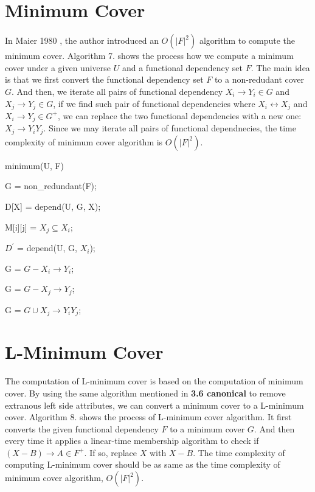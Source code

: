 \documentclass[11pt]{book}
\begin{document}
\section{Minimum Cover}

In Maier 1980 \cite{maier1980minimum}, the author introduced an $O(|F|^2)$ algorithm to compute the minimum cover. Algorithm 7. shows the process how we compute a minimum cover under a given universe $U$ and a functional dependency set $F$. The main idea is that we first convert the functional dependency set $F$ to a non-redudant cover $G$. And then, we iterate all pairs of functional dependency $X_i \rightarrow Y_i \in G$ and $X_j \rightarrow Y_j \in G$, if we find such pair of functional dependencies where $X_i \leftrightarrow X_j$ and $X_i \rightarrow Y_j \in G^{+}$, we can replace the two functional dependencies with a new one: $X_j \rightarrow Y_iY_j$. Since we may iterate all pairs of functional dependnecies, the time complexity of minimum cover algorithm is $O(|F|^2)$.

\begin{algorithm}
  \caption{minimum(U, F)}
  
  \SetAlgoLined
  
  G = non\_redundant(F);
  
   {
  	D[X] = depend(U, G, X);
  }
  
   {
  	 {
  	  M[i][j] = $X_j \subseteq X_i$;  	
  	}
  }
  
   {
    $D^{'}$ = depend(U, G, $X_i$);
    
     {
       {
      	G = $G - {X_i \rightarrow Y_i}$;
      	
      	G = $G - {X_j \rightarrow Y_j}$;

      	G = $G \cup {X_j \rightarrow Y_iY_j}$;
      }
    }    
  }
\end{algorithm}

\section{L-Minimum Cover}

The computation of L-minimum cover is based on the computation of minimum cover. By using the same algorithm \cite{beeri1979computational} mentioned in \textbf{3.6 canonical} to remove extranous left side attributes, we can convert a minimum cover to a L-minimum cover. Algorithm 8. shows the process of L-minimum cover algorithm. It first converts the given functional dependency $F$ to a minimum cover $G$. And then every time it applies a linear-time membership algorithm to check if $(X - B) \rightarrow A \in F^{+}$. If so, replace $X$ with $X - B$. The time complexity of computing L-minimum cover should be as same as the time complexity of minimum cover algorithm, $O(|F|^2)$.
\end{document}
